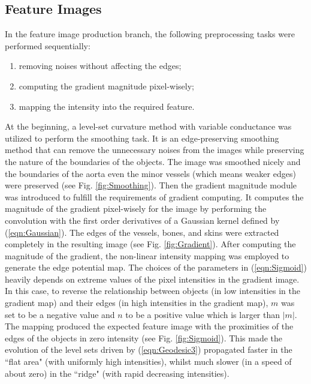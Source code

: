 \subsection{Feature Images}
In the feature image production branch, the following preprocessing tasks were performed sequentially:
\begin{enumerate}
\item removing noises without affecting the edges;
\item computing the gradient magnitude pixel-wisely;
\item mapping the intensity into the required feature.
\end{enumerate}
At the beginning, a level-set curvature method with variable conductance was utilized to perform the smoothing task.
It is an edge-preserving smoothing method that can remove the unnecessary noises from the images while preserving the nature of the boundaries of the objects.
The image was smoothed nicely and the boundaries of the aorta even the minor vessels (which means weaker edges) were preserved (see Fig. \ref{fig:Smoothing}).
Then the gradient magnitude module was introduced to fulfill the requirements of gradient computing.
It computes the magnitude of the gradient pixel-wisely for the image by performing the convolution with the first order derivatives of a Gaussian kernel defined by (\ref{eqn:Gaussian}).
The edges of the vessels, bones, and skins were extracted completely in the resulting image (see Fig. \ref{fig:Gradient}).
After computing the magnitude of the gradient, the non-linear intensity mapping was employed to generate the edge potential map.
The choices of the parameters in (\ref{eqn:Sigmoid}) heavily depends on extreme values of the pixel intensities in the gradient image.
In this case, to reverse the relationship between objects (in low intensities in the gradient map) and their edges (in high intensities in the gradient map), $m$ was set to be a negative value and $n$ to be a positive value which is larger than $|m|$.
The mapping produced the expected feature image with the proximities of the edges of the objects in zero intensity (see Fig. \ref{fig:Sigmoid}).
This made the evolution of the level sets driven by (\ref{eqn:Geodesic3}) propagated faster in the ``flat area" (with uniformly high intensities), whilst much slower (in a speed of about zero) in the ``ridge" (with rapid decreasing intensities).
